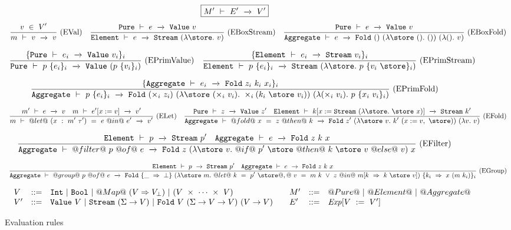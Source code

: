 
\begin{figure*}

$$
\boxed{M'~\vdash~E'~\xrightarrow~~V'}
$$
$$
\ruleIN
{
    v~\in~V'
}
{
    \SourceStepX{m}{v}{v}
}{EVal}
\ruleIN
{
    \SourceStepXP{e}{\VValue{v}}
}
{
    \SourceStepXE{e}{\VStream{(\lam{\store} v)}}
}{EBoxStream}
\ruleIN
{
    \SourceStepXP{e}{\VValue{v}}
}
{
    \SourceStepXA{e}{\VFold{()}{(\lam{\store~()} ())}{(\lam{()} v)}}
}{EBoxFold}
$$

$$
\ruleIN
{
  \{ \SourceStepXP{e_i}{\VValue{v_i}} \}_i
}
{
  \SourceStepXP
    {p~\{ e_i \}_i }
    {\VValue{(p~\{v_i\}_i)}}
}{EPrimValue}
\ruleIN
{
  \{ \SourceStepXE{e_i}{\VStream{v_i}} \}_i
}
{
  \SourceStepXE
    {p~\{ e_i \}_i }
    {\VStream{(\lam{\store} p~\{v_i~\store\}_i)}}
}{EPrimStream}
$$

$$
\ruleIN
{
  \{ \SourceStepXA{e_i}{\VFold{z_i}{k_i}{x_i}} \}_i
}
{
  \SourceStepXA
    {p~\{ e_i \}_i }
    {\VFold
      {(\times_i~z_i)}
      {(\lam{\store~(\times_i~v_i)}
        \times_i (k_i~\store~v_i))}
      {(\lam{(\times_i~v_i)}
        p~\{x_i~v_i\}_i)}}
}{EPrimFold}
$$

$$
\ruleIN
{
  \SourceStepX{m'}{e}{v}
  \quad
  \SourceStepX{m}{e'[x:=v]}{v'}
}
{
  \SourceStepX
    {m}
    {@let@~(x~:~m'~\tau')~=~e~@in@~e'}
    {v'}
}{ELet}
\ruleIN
{
  \SourceStepXP{z}{\VValue{z'}}
  \quad
  \SourceStepXE{k[x:=\VStream{(\lam{\store} \store~x)}]}{\VStream{k'}}
}
{
  \SourceStepXA
    {@fold@~x~=~z~@then@~k}
    {\VFold
      {z'}
      {(\lam{\store~v} k'~(x:=v,~\store))}
      {(\lam{v} v)}}
}{EFold}
$$

$$
\ruleIN
{
  \SourceStepXE{p}{\VStream{p'}}
  \quad
  \SourceStepXA{e}{\VFold{z}{k}{x}}
}
{
  \SourceStepXA
    {@filter@~p~@of@~e}
    {\VFold
      {z}
      {(\lam{\store~v}
         @if@~p'~\store~@then@~k~\store~v~@else@~v)}
      {x}}
}{EFilter}
$$

$$
\ruleIN
{
  \SourceStepXE{p}{\VStream{p'}}
  \quad
  \SourceStepXA{e}{\VFold{z}{k}{x}}
}
{
  \SourceStepXA
    {@group@~p~@of@~e}
    {\VFold
      {\{\_~\Rightarrow~\bot\}}
      {(\lam{\store~m}
        @let@~k~=~p'~\store@,@~
              v~=~m~k~\vee~z
        ~@in@~
          m[k~\Rightarrow~k~\store~v])}
      {\{k_i~\Rightarrow~x~(m~k_i)\}_i}}
}{EGroup}
$$

$$
\begin{array}{ll}

\begin{array}{lll}
V & ::= & \NN~|~\BB~|~@Map@~(V \Rightarrow V_\bot)~|~(V~\times~\cdots~\times~V) \\
V'& ::= & \VValue{V}~|~\VStream{(\Sigma \to V)}~|~\VFold{V}{(\Sigma \to V \to V)}{(V \to V)}
\end{array}

&

\begin{array}{lll}
M'& ::= & @Pure@~|~@Element@~|~@Aggregate@ \\
E'& ::= & \mi{Exp}[V~:=~V']
\end{array}

\end{array}
$$


\caption{Evaluation rules}
\label{fig:source:eval}
\end{figure*}


